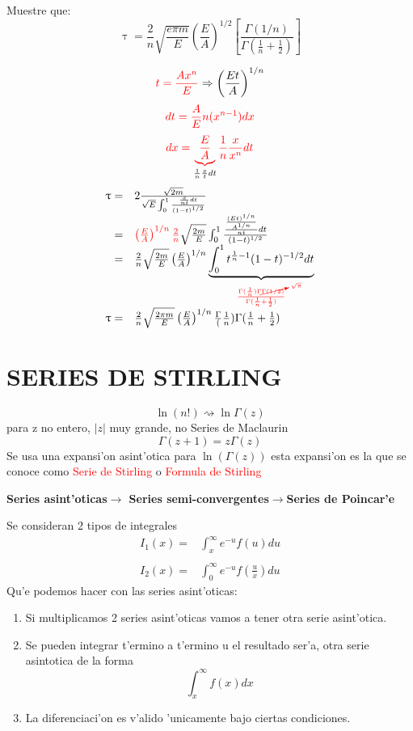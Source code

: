 \documentclass{article}
\theoremstyle{definition}
\begin{document}
Muestre que:
\[\uptau=\frac{2}{n}\sqrt{\frac{e\pi m}{E}}\left(\frac{E}{A}\right)^{1/2}\left[\frac{\Gamma (1/n)}{\Gamma (\frac{1}{n}+\frac{1}{2})}\right]\]
\begin{center}
\end{center}
\[\textcolor{red}{t=\frac{Ax^n}{E}}\Rightarrow \left(\frac{Et}{A}\right)^{1/n}\]
\[\textcolor{red}{dt=\frac{A}{E}n(x^{n-1})dx}\]
\[\textcolor{red}{dx=\underbrace{\frac{E}{A}}_{\textcolor{black}{\frac{1}{n}\frac{x}{t}dt}}\frac{1}{n}\frac{x}{x^n}dt}\]
\[
\begin{array}{rl}
	\uptau =& 2\frac{\sqrt{2m}}{\sqrt{E}\int^1_0\frac{\frac{x}{nt}dt}{(1-t)^{1/2}}}\\
	=&\textcolor{red}{\left(\frac{E}{A}\right)^{1/n}\frac{2}{n}}\sqrt{\frac{2m}{E}}\int^1_0\frac{\frac{\frac{(Et)^{1/n}}{A^{1/n}}}{nt}dt}{(1-t)^{1/2}}\\
	=&\frac{2}{n}\sqrt{\frac{2m}{E}}\left(\frac{E}{A}\right)^{1/n}\underbrace{\int^1_0t^{\frac{1}{n}-1}(1-t)^{-1/2}dt}_{\textcolor{red}{\frac{\Gamma (\frac{1}{n})\Gamma \cancelto{\sqrt{\pi}}{\Gamma (1/2)}}{\Gamma (\frac{1}{n}+\frac{1}{2})}}}\\
	\uptau =& \frac{2}{n}\sqrt{\frac{2\pi m}{E}}\left(\frac{E}{A}\right)^{1/n}\frac{\Gamma} (\frac{1}{n}){\Gamma (\frac{1}{n}+\frac{1}{2})}
\end{array}
\]
\section{SERIES DE STIRLING}
\[\ln (n!)\rightsquigarrow \ln \Gamma (z)\]
para z no entero, $|z|$ muy grande, no Series de Maclaurin
\[\Gamma (z+1)=z\Gamma (z)\]
Se usa una expansi'on asint'otica para $\ln (\Gamma (z))$ esta expansi'on es la que se conoce como \textcolor{red}{Serie de Stirling} o \textcolor{red}{Formula de Stirling}

\textbf{Series asint'oticas$\to$ Series semi-convergentes$\to$Series de Poincar'e}

Se consideran 2 tipos de integrales 
\[
\begin{array}{rl}
	I_1 (x)=& \int^{\infty}_xe^{-u}f(u)du\\
	\\
	I_2 (x)=& \int^{\infty}_0e^{-u}f\left(\frac{u}{x}\right)du
\end{array}
\]
Qu'e podemos hacer con las series asint'oticas:
\begin{enumerate}
	\item Si multiplicamos 2 series asint'oticas vamos a tener otra serie asint'otica.
	\item Se pueden integrar t'ermino a t'ermino u el resultado ser'a, otra serie asintotica de la forma
	\[\int^{\infty}_xf(x)dx\]
	\item La diferenciaci'on es v'alido 'unicamente bajo ciertas condiciones.
\end{enumerate}
\end{document}
